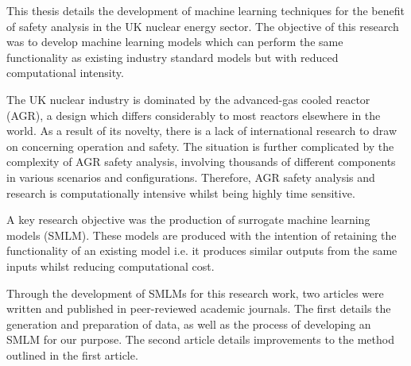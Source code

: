 %
{
	
	\singlespacing \noindent
	This thesis details the development of machine learning techniques for the benefit of safety analysis in the UK nuclear energy sector. The objective of this research was to develop machine learning models which can perform the same functionality as existing industry standard models but with reduced computational intensity.  
	
	\singlespacing \noindent
	The UK nuclear industry is dominated by the advanced-gas cooled reactor (AGR), a design which differs considerably to most reactors elsewhere in the world. As a result of its novelty, there is a lack of international research to draw on concerning operation and safety. The situation is further complicated by the complexity of AGR safety analysis, involving thousands of different components in various scenarios and configurations. Therefore, AGR safety analysis and research is computationally intensive whilst being highly time sensitive.
	
	\singlespacing \noindent
	A key research objective was the production of surrogate machine learning models (SMLM). These models are produced with the intention of retaining the functionality of an existing model i.e. it produces similar outputs from the same inputs whilst reducing computational cost.
	
	\singlespacing \noindent
	Through the development of SMLMs for this research work, two articles were written and published in peer-reviewed academic journals. The first details the generation and preparation of data, as well as the process of developing an SMLM for our purpose. The second article details improvements to the method outlined in the first article. 
	


}


